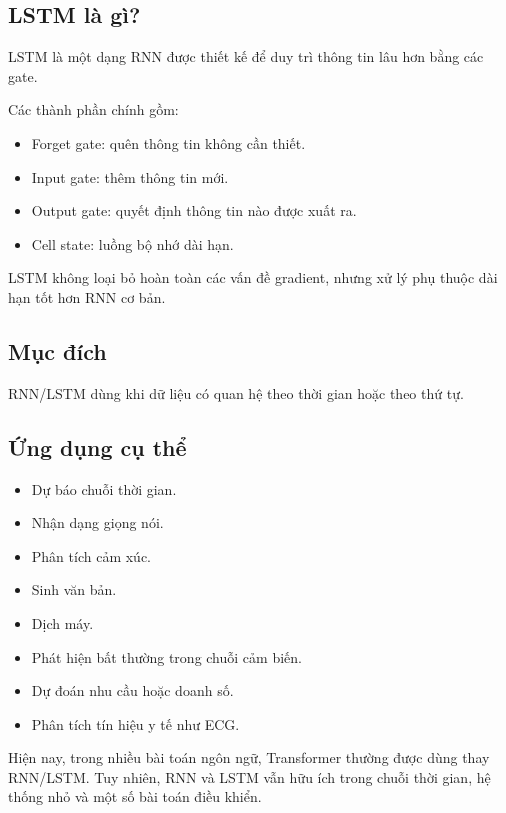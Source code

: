 \documentclass[12pt,a4paper]{report}
\begin{document}
\subsection{LSTM là gì?}

LSTM là một dạng RNN được thiết kế để duy trì thông tin lâu hơn bằng các gate.

Các thành phần chính gồm:

\begin{itemize}[leftmargin=1.5em]
    \item Forget gate: quên thông tin không cần thiết.
    \item Input gate: thêm thông tin mới.
    \item Output gate: quyết định thông tin nào được xuất ra.
    \item Cell state: luồng bộ nhớ dài hạn.
\end{itemize}

LSTM không loại bỏ hoàn toàn các vấn đề gradient, nhưng xử lý phụ thuộc dài hạn tốt hơn RNN cơ bản.

\subsection{Mục đích}

RNN/LSTM dùng khi dữ liệu có quan hệ theo thời gian hoặc theo thứ tự.

\subsection{Ứng dụng cụ thể}

\begin{itemize}[leftmargin=1.5em]
    \item Dự báo chuỗi thời gian.
    \item Nhận dạng giọng nói.
    \item Phân tích cảm xúc.
    \item Sinh văn bản.
    \item Dịch máy.
    \item Phát hiện bất thường trong chuỗi cảm biến.
    \item Dự đoán nhu cầu hoặc doanh số.
    \item Phân tích tín hiệu y tế như ECG.
\end{itemize}

Hiện nay, trong nhiều bài toán ngôn ngữ, Transformer thường được dùng thay RNN/LSTM. Tuy nhiên, RNN và LSTM vẫn hữu ích trong chuỗi thời gian, hệ thống nhỏ và một số bài toán điều khiển.
\end{document}
